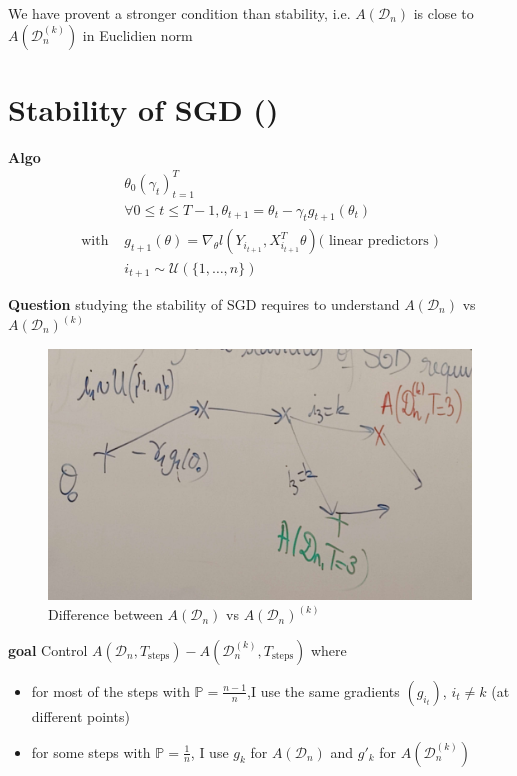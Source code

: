 \begin{note}[]
    We have provent a stronger condition than stability, i.e. $ A(\mathcal{D}_n) $ is close to $ A(\mathcal{D}_n ^{(k)}) $ in Euclidien norm 
\end{note}

\section{Stability of SGD ()}
\textbf{Algo} 
\begin{align*}
                &\theta _0 (\gamma _t)_{t=1} ^T \\
                &\forall 0 \leq t \leq T-1, \theta _{t+1} = \theta _t - \gamma _t g_{t+1} (\theta _t) \\
    \text{with }&g_{t+1}(\theta ) = \nabla _\theta l(Y_{i_{t+1}}, X_{i_{t+1}}^T \theta ) (\text{ linear predictors )} \\
                &i_{t+1} \sim \mathcal{U}(\{1, \dots, n\})
\end{align*}

\textbf{Question} studying the stability of SGD requires to understand $A(\mathcal{D}_n)$ vs $A(\mathcal{D}_n)^{(k)}$
\begin{figure}[!h]
    \centering
    \includegraphics[width=.65\textwidth]{figs/graph.jpg}
    \caption{Difference between $A(\mathcal{D}_n)$ vs $A(\mathcal{D}_n)^{(k)}$}
\end{figure}

\textbf{goal} Control $A(\mathcal{D}_n, T_{\text{steps}}) - A(\mathcal{D}_n^{(k)}, T_{\text{steps}})$ where
\begin{itemize}
    \item for most of the steps with $\mathbb{P} = \frac{n-1}{n}$,I use the same gradients $(g_{i_t})$, $i_t \neq k$ (at different points)
    \item for some steps with $\mathbb{P} = \frac{1}{n}$, I use $g_k$ for $A(\mathcal{D}_n)$ and $g'_k$ for $A(\mathcal{D}_n^{(k)})$
\end{itemize}


